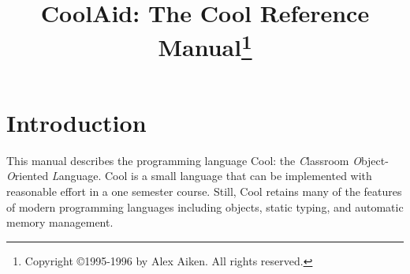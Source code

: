 \newcommand {\thus}{{\dot{. \: .}\;}}

\newcommand {\bigO}[1]{{\cal O}(#1)}

\newcommand {\app}{\!\!:\!}
\newcommand {\hastype}{::}
\newcommand{\hast}{:}
\newcommand{\qt}[1]{\mbox{``#1''}}
\newcommand{\TexComment}[1]{}

\newcommand{\dq}{\m{\tt "}}
\newcommand{\flatqt}[1]{\m{\dq #1 \dq}}
\newcommand{\seq}{\subseteq}
\newcommand{\derives}{\vdash}

\newcommand{\grammar}{::=}
\newcommand{\gor}{\,|\,}

\newcommand{\infrule}[2]{\displaystyle{\displaystyle\strut{#1}} \over %
                                        {\displaystyle\strut {#2}}}
\newcommand{\cinfrule}[3]{\parbox{14cm}{\hfil$\infrule{#1}{#2}$\hfil}\parbox{4cm}{$\,#3$\hfil}}


\newcommand{\kw}[1]{\m{\bf #1}}
\newcommand{\nt}[1]{\m{\it #1}}
\newcommand{\tm}[1]{\m{#1}}
\newcommand{\s}{\;\,}
\newcommand{\assgn}{\s\m{\tt <-}\s}
\newcommand{\styp}{{\tt SELF\_TYPE}}


\newcommand{\attr}[3]{#1:#2\leftarrow#3}
\newcommand{\classmap}[2]{class(#1) = (#2)}
\newcommand{\tcrule}[3]{\frac{#1}{#2}\eqno\mbox{#3}}
\newcommand{\ossimple}[6]{#1,#2,#3\vdash #4 : #5,#6}
\newcommand{\osrule}[8]{\frac{#7}{\ossimple{#1}{#2}{#3}{#4}{#5}{#6}}\eqno
\mbox{#8}}
\def\U#1{{\sf{}#1}}
\def\S#1{{\tt{}#1}} %
\def\C#1{{\tt{}#1}}



\title{CoolAid: The Cool Reference Manual\thanks{
Copyright \copyright 1995-1996 by Alex Aiken.
All rights reserved.}}  

\author{ }
\date{ }
\maketitle



\section{Introduction}

This manual describes the programming language Cool: the {\em C}lassroom
{\em O}bject-{\em O}riented {\em L}anguage.
Cool is a small language that can be
implemented with reasonable effort in a one semester course.  Still, Cool
retains many of the features of modern programming languages including
objects, static typing, and automatic memory management.

